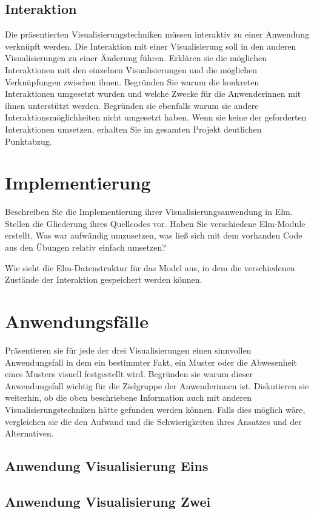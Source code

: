 \documentclass[usegeometry=true]{scrartcl}
\begin{document}
\subsection{Interaktion}
Die präsentierten Visualisierungstechniken müssen interaktiv zu einer Anwendung verknüpft werden.
Die Interaktion mit einer Visualisierung soll in den anderen Visualisierungen zu einer Änderung führen. 
Erklären sie die möglichen Interaktionen mit den einzelnen Visualisierungen und die möglichen Verknüpfungen zwischen ihnen. Begründen Sie warum die konkreten Interaktionen umgesetzt wurden und welche Zwecke für die Anwenderinnen mit ihnen unterstützt werden. Begründen sie ebenfalls warum sie andere Interaktionsmöglichkeiten nicht umgesetzt haben. Wenn sie keine der geforderten Interaktionen umsetzen, erhalten Sie im gesamten Projekt deutlichen Punktabzug. 

\section{Implementierung}
Beschreiben Sie die Implementierung ihrer Visualisierungsanwendung in Elm. Stellen die Gliederung ihres Quellcodes vor. Haben Sie verschiedene Elm-Module erstellt. Was war aufwändig umzusetzen, was ließ sich mit dem vorhanden Code aus den Übungen relativ einfach umsetzen? 

Wie sieht die Elm-Datenstruktur für das Model aus, in dem die verschiedenen Zustände der Interaktion gespeichert werden können.

\section{Anwendungsfälle}
Präsentieren sie für jede der drei Visualisierungen einen sinnvollen Anwendungsfall 
in dem ein bestimmter Fakt, ein Muster oder die Abwesenheit eines Musters visuell festgestellt wird.
Begründen sie warum dieser Anwendungsfall wichtig für die Zielgruppe der Anwenderinnen ist.
Diskutieren sie weiterhin, ob die oben beschriebene Information auch mit anderen 
Visualisierungstechniken hätte gefunden werden können.
Falls dies möglich wäre, vergleichen sie die den Aufwand und die Schwierigkeiten ihres Ansatzes und der Alternativen. 
\subsection{Anwendung Visualisierung Eins}

\subsection{Anwendung Visualisierung Zwei}
\end{document}
